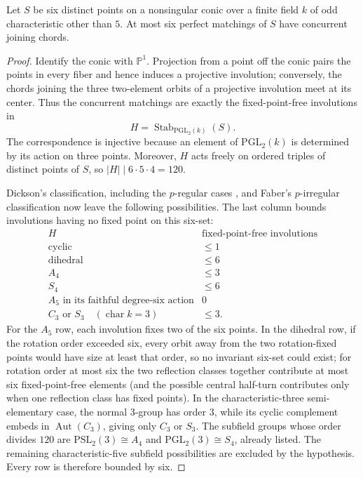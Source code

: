 \begin{lemma}\label{lem:conic-matchings}
Let \(S\) be six distinct points on a nonsingular conic over a finite
field \(k\) of odd characteristic other than \(5\).  At most six perfect
matchings of \(S\) have concurrent joining chords.
\end{lemma}

\begin{proof}
Identify the conic with \(\mathbb P^1\).  Projection from a point off the
conic pairs the points in every fiber and hence induces a projective
involution; conversely, the chords joining the three two-element orbits
of a projective involution meet at its center.  Thus the concurrent
matchings are exactly the fixed-point-free involutions in
\[
 H=\operatorname{Stab}_{\mathrm{PGL}_2(k)}(S).
\]
The correspondence is injective because an element of
\(\mathrm{PGL}_2(k)\) is determined by its action on three points.
Moreover, \(H\) acts freely on ordered triples of distinct points of
\(S\), so \(\lvert H\rvert\mid6\cdot5\cdot4=120\).

Dickson's classification, including the \(p\)-regular cases
\cite[\S\S239--261]{Dickson1901}, and Faber's \(p\)-irregular
classification \cite[Theorem~1.1]{Faber2023} now leave the following
possibilities.  The last column bounds involutions having no fixed point
on this six-set:
\[
\begin{array}{c|c}
H&\text{fixed-point-free involutions}\\ \hline
\text{cyclic}&\leq1\\
\text{dihedral}&\leq6\\
A_4&\leq3\\
S_4&\leq6\\
A_5\text{ in its faithful degree-six action}&0\\
C_3\text{ or }S_3\quad(\operatorname{char}k=3)&\leq3.
\end{array}
\]
For the \(A_5\) row, each involution fixes two of the six points.  In
the dihedral row, if the rotation order exceeded six, every orbit away
from the two rotation-fixed points would have size at least that order,
so no invariant six-set could exist; for rotation order at most six the
two reflection classes together contribute at most six fixed-point-free
elements (and the possible central half-turn contributes only when one
reflection class has fixed points).  In
the characteristic-three semi-elementary case, the normal \(3\)-group
has order \(3\), while its cyclic complement embeds in
\(\operatorname{Aut}(C_3)\), giving only \(C_3\) or \(S_3\).
The subfield groups whose order divides \(120\) are
\(\mathrm{PSL}_2(3)\cong A_4\) and
\(\mathrm{PGL}_2(3)\cong S_4\), already listed.  The remaining
characteristic-five subfield possibilities are excluded by the
hypothesis.  Every row is therefore bounded by six.
\end{proof}

